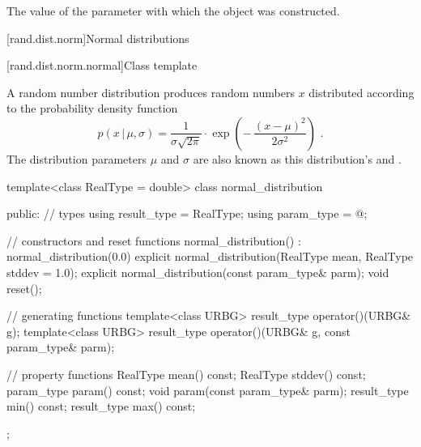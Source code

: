 \begin{itemdescr}
\pnum
\returns
The value of the  parameter
 with which the object was constructed.
\end{itemdescr}%
%



[rand.dist.norm]{Normal distributions}%
%


[rand.dist.norm.normal]{Class template }%
%
%

\pnum
A  random number distribution
produces random numbers $x$
distributed according to
the probability density function%
%
%
\[%
 p(x\,|\,\mu,\sigma)
      = \frac{1}{\sigma \sqrt{2\pi}}
        \cdot
        \exp{\left(- \, \frac{(x - \mu)^2}
                             {2 \sigma^2}
             \right)
            }
 \text{ .}
\]
The distribution parameters $\mu$ and $\sigma$
are also known as this distribution's %
%
and %
%
%
.

%
%
\begin{codeblock}
template<class RealType = double>
  class normal_distribution {
  public:
    // types
    using result_type = RealType;
    using param_type  = @\unspec@;

    // constructors and reset functions
    normal_distribution() : normal_distribution(0.0) {}
    explicit normal_distribution(RealType mean, RealType stddev = 1.0);
    explicit normal_distribution(const param_type& parm);
    void reset();

    // generating functions
    template<class URBG>
      result_type operator()(URBG& g);
    template<class URBG>
      result_type operator()(URBG& g, const param_type& parm);

    // property functions
    RealType mean() const;
    RealType stddev() const;
    param_type param() const;
    void param(const param_type& parm);
    result_type min() const;
    result_type max() const;
  };
\end{codeblock}

